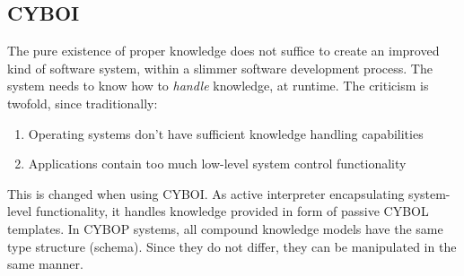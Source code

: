 %
%
%
%
%
%
%

\subsection{CYBOI}
\label{cyboi_heading}

The pure existence of proper knowledge does not suffice to create an improved
kind of software system, within a slimmer software development process. The
system needs to know how to \emph{handle} knowledge, at runtime. The criticism
is twofold, since traditionally:

\begin{enumerate}
    \item Operating systems don't have sufficient knowledge handling capabilities
    \item Applications contain too much low-level system control functionality
\end{enumerate}

This is changed when using CYBOI. As active interpreter encapsulating
system-level functionality, it handles knowledge provided in form of passive
CYBOL templates. In CYBOP systems, all compound knowledge models have the same
type structure (schema). Since they do not differ, they can be manipulated in
the same manner.




